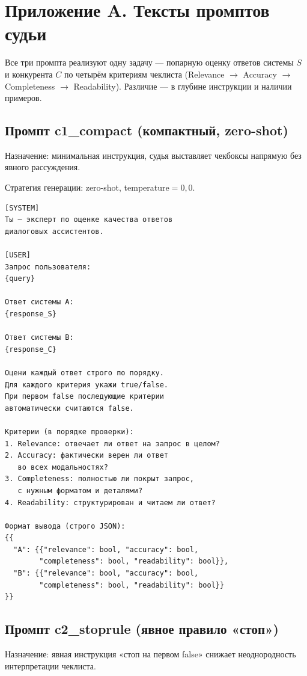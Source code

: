 \chapter*{Приложение A. Тексты промптов судьи}
\label{app:prompts}

Все три промпта реализуют одну задачу — попарную оценку ответов
системы $S$ и конкурента $C$ по четырём критериям чеклиста
(Relevance $\to$ Accuracy $\to$ Completeness $\to$ Readability).
Различие — в глубине инструкции и наличии примеров.

\section{Промпт c1\_compact (компактный, zero-shot)}
\label{app:compact}

Назначение: минимальная инструкция, судья выставляет
чекбоксы напрямую без явного рассуждения.

Стратегия генерации: zero-shot, temperature$=0{,}0$.

\begin{verbatim}
[SYSTEM]
Ты — эксперт по оценке качества ответов
диалоговых ассистентов.

[USER]
Запрос пользователя:
{query}

Ответ системы A:
{response_S}

Ответ системы B:
{response_C}

Оцени каждый ответ строго по порядку.
Для каждого критерия укажи true/false.
При первом false последующие критерии
автоматически считаются false.

Критерии (в порядке проверки):
1. Relevance: отвечает ли ответ на запрос в целом?
2. Accuracy: фактически верен ли ответ
   во всех модальностях?
3. Completeness: полностью ли покрыт запрос,
   с нужным форматом и деталями?
4. Readability: структурирован и читаем ли ответ?

Формат вывода (строго JSON):
{{
  "A": {{"relevance": bool, "accuracy": bool,
        "completeness": bool, "readability": bool}},
  "B": {{"relevance": bool, "accuracy": bool,
        "completeness": bool, "readability": bool}}
}}
\end{verbatim}

\section{Промпт c2\_stoprule (явное правило «стоп»)}
\label{app:stoprule}

Назначение: явная инструкция «стоп на первом false»
снижает неоднородность интерпретации чеклиста.

